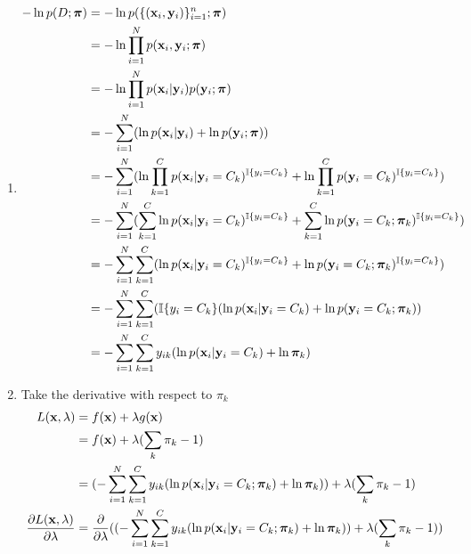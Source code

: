 \documentclass[submit]{harvardml}
\begin{document}
\begin{enumerate}
    \item 
    \begin{equation}
    \begin{split}
         -\ln p(D ; \boldsymbol{\pi}) &= -\ln p(\{(\mathbf{x}_i,\mathbf{y}_i)\}_{i=1}^n; \boldsymbol{\pi})\\
        &= -\ln \displaystyle\prod_{i=1}^{N} p(\mathbf{x}_i, \mathbf{y}_i; \boldsymbol{\pi})\\
        &= -\ln \displaystyle\prod_{i=1}^{N} p (\mathbf{x}_i | \mathbf{y}_i) p (\mathbf{y}_i ; \boldsymbol{\pi}) \\
        &= -\sum_{i=1}^{N}(\ln p(\mathbf{x}_i | \mathbf{y}_i) + \ln p (\mathbf{y}_i ; \boldsymbol{\pi})) \\
        &= -\sum_{i=1}^{N}(\ln \displaystyle\prod_{k=1}^{C} p(\mathbf{x}_i | \mathbf{y}_i = C_k )^{\mathbb{I}\{y_i = C_k\}} + \ln \displaystyle\prod_{k=1}^{C} p (\mathbf{y}_i = C_k)^{\mathbb{I}\{y_i = C_k\}}) \\
        &= -\sum_{i=1}^{N}(\sum_{k=1}^{C} \ln p(\mathbf{x}_i | \mathbf{y}_i = C_k)^{\mathbb{I}\{y_i = C_k\}} + \sum_{k=1}^{C} \ln p (\mathbf{y}_i = C_k ; \boldsymbol{\pi}_k)^{\mathbb{I}\{y_i = C_k\}}) \\
        &= -\sum_{i=1}^{N} \sum_{k=1}^{C} (\ln p(\mathbf{x}_i | \mathbf{y}_i = C_k)^{\mathbb{I}\{y_i = C_k\}} + \ln p (\mathbf{y}_i = C_k ; \boldsymbol{\pi}_k)^{\mathbb{I}\{y_i = C_k\}}) \\
        &= -\sum_{i=1}^{N} \sum_{k=1}^{C} (\mathbb{I}\{y_i = C_k\} (\ln p(\mathbf{x}_i | \mathbf{y}_i = C_k) + \ln p (\mathbf{y}_i = C_k ; \boldsymbol{\pi}_k)) \\
        &= -\sum_{i=1}^{N} \sum_{k=1}^{C} y_{ik} (\ln p(\mathbf{x}_i | \mathbf{y}_i = C_k) + \ln \boldsymbol{\pi}_k) \\
    \end{split}
    \end{equation}
    \item    
    Take the derivative with respect to $\pi_k$
    \begin{equation}
        \begin{split}
            L(\boldx, \lambda) &=  f(\boldx) + \lambda g(\boldx) \\
            &= f(\boldx) + \lambda (\sum_k\pi_k - 1) \\
            &= (-\sum_{i=1}^{N} \sum_{k=1}^{C} y_{ik} (\ln p(\boldx_i | \boldy_i = C_k; \bpi_k) + \ln \bpi_k)) + \lambda (\sum_k\pi_k - 1)\\
            \frac{\partial L(\boldx, \lambda)}{\partial \lambda} &= \frac{\partial}{\partial \lambda}((-\sum_{i=1}^{N} \sum_{k=1}^{C} y_{ik} (\ln p(\boldx_i | \boldy_i = C_k; \bpi_k) + \ln \bpi_k)) + \lambda (\sum_k\pi_k - 1)) \\

\end{split}
\end{equation}
\end{enumerate}
\end{document}
